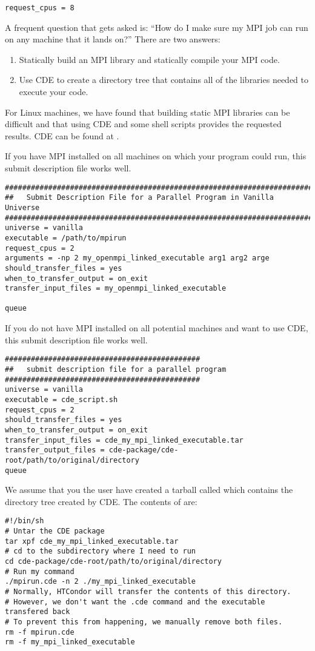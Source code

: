 \begin{verbatim}
request_cpus = 8
\end{verbatim}

A frequent question that gets asked is: ``How do I make sure my MPI job can run 
on any machine that it lands on?'' There are two answers:
\begin{enumerate}
\item Statically build an MPI library and statically compile your MPI code.
\item Use CDE to create a directory tree that contains all of the libraries 
needed to execute your code.
\end{enumerate}

For Linux machines, we have found that building static MPI libraries can be 
difficult and that 
using CDE and some shell scripts provides the requested results. CDE can be
found at .

If you have MPI installed on all machines on which your program could run, this
submit description file works well.
\begin{verbatim}
################################################################################
##   Submit Description File for a Parallel Program in Vanilla Universe
################################################################################
universe = vanilla
executable = /path/to/mpirun
request_cpus = 2
arguments = -np 2 my_openmpi_linked_executable arg1 arg2 arge
should_transfer_files = yes
when_to_transfer_output = on_exit
transfer_input_files = my_openmpi_linked_executable

queue
\end{verbatim}

If you do not have MPI installed on all potential machines and want to use CDE,
this submit description file works well.
\begin{verbatim}
#############################################
##   submit description file for a parallel program
#############################################
universe = vanilla
executable = cde_script.sh
request_cpus = 2
should_transfer_files = yes
when_to_transfer_output = on_exit
transfer_input_files = cde_my_mpi_linked_executable.tar
transfer_output_files = cde-package/cde-root/path/to/original/directory
queue
\end{verbatim}

We assume that you the user have created a tarball called 
 which contains the directory tree
created by CDE.
The contents of  are:
\begin{verbatim}
#!/bin/sh
# Untar the CDE package
tar xpf cde_my_mpi_linked_executable.tar
# cd to the subdirectory where I need to run
cd cde-package/cde-root/path/to/original/directory
# Run my command
./mpirun.cde -n 2 ./my_mpi_linked_executable
# Normally, HTCondor will transfer the contents of this directory.
# However, we don't want the .cde command and the executable transfered back
# To prevent this from happening, we manually remove both files.
rm -f mpirun.cde
rm -f my_mpi_linked_executable
\end{verbatim}
